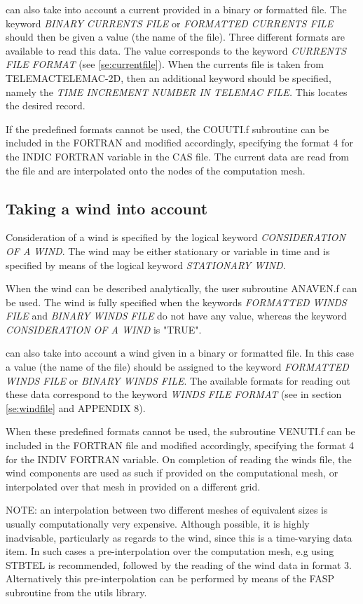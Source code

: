  \tomawac can also take into account a current provided in a binary or formatted file. The keyword \textit{BINARY CURRENTS FILE }or\textit{ FORMATTED CURRENTS FILE} should then be given a value (the name of the file). Three different formats are available to read this data. The value corresponds to the keyword \textit{CURRENTS FILE FORMAT} (see \ref{se:currentfile}). When the currents file is taken from TELEMACTELEMAC-2D, then an additional keyword should be specified, namely the \textit{TIME INCREMENT NUMBER IN TELEMAC FILE.} This locates the desired record.

 If the predefined formats cannot be used, the COUUTI.f subroutine can be included in the FORTRAN and modified accordingly, specifying the format 4 for the INDIC FORTRAN variable in the CAS file. The current data are read from the file and are interpolated onto the nodes of the computation mesh.


\subsection{ Taking a wind into account}
\label{se:wind}
 Consideration of a wind is specified by the logical keyword \textit{CONSIDERATION OF A WIND}. The wind may be either stationary or variable in time and is specified by means of the logical keyword \textit{STATIONARY WIND}.

 When the wind can be described analytically, the user subroutine ANAVEN.f can be used. The wind is fully specified when the keywords \textit{FORMATTED WINDS FILE} and \textit{BINARY WINDS FILE} do not have any value, whereas the keyword \textit{CONSIDERATION OF A WIND }is "TRUE".

 \tomawac can also take into account a wind given in a binary or formatted file. In this case a value (the name of the file) should be assigned to the keyword \textit{FORMATTED WINDS FILE }or \textit{BINARY WINDS FILE}. The available formats for reading out these data correspond to the keyword \textit{WINDS FILE FORMAT} (see in section \ref{se:windfile} and APPENDIX 8).

 When these predefined formats cannot be used, the subroutine VENUTI.f can be included in the FORTRAN file and modified accordingly, specifying the format 4 for the INDIV FORTRAN variable. On completion of reading the winds file, the wind components are used as such if provided on the computational mesh, or interpolated over that mesh in provided on a different grid.

 NOTE: an interpolation between two different meshes of equivalent sizes is usually computationally very expensive. Although possible, it is highly inadvisable, particularly as regards to the wind, since this is a time-varying data item. In such cases a pre-interpolation over the computation mesh, e.g using STBTEL is recommended, followed by the reading of the wind data in format 3. Alternatively this pre-interpolation can be performed by means of the FASP subroutine from the utils library.


